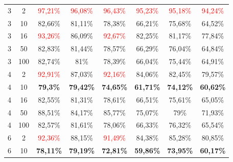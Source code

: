 \begin{table}[ht]
\begin{tabular}{cc|c|c|c|c|c|c}
        {3} & {2}   & \textcolor{red}{97,21\%} & \textcolor{red}{96,08\%} & \textcolor{red}{96,43\%} & \textcolor{red}{95,23\%} & \textcolor{red}{95,18\%} & \textcolor{red}{94,24\%} \\
        {3} & {10}  & {82,66\%}                & {81,11\%}                & {78,38\%}                & {66,21\%}                & {75,68\%}                & {64,52\%}                \\
        {3} & {16}  & \textcolor{red}{93,26\%} & {86,09\%}                & \textcolor{red}{92,67\%} & {82,25\%}                & {81,17\%}                & {77,84\%}                \\
        {3} & {50}  & {82,83\%}                & {81,44\%}                & {78,57\%}                & {66,29\%}                & {76,04\%}                & {64,84\%}                \\
        {3} & {100} & {82,74\%}                & {81\%}                   & {78,39\%}                & {66,04\%}                & {75,44\%}                & {64,91\%}                \\
        {4} & {2}   & \textcolor{red}{92,91\%} & {87,03\%}                & \textcolor{red}{92,16\%} & {84,06\%}                & {82,45\%}                & {79,57\%}                \\
        {4} & {10}  & \textbf{79,3\%}          & \textbf{79,42\%}         & \textbf{74,65\%}         & \textbf{61,71\%}         & \textbf{74,12\%}         & \textbf{60,62\%}         \\
        {4} & {16}  & {82,55\%}                & {81,31\%}                & {78,61\%}                & {66,51\%}                & {75,61\%}                & {65,05\%}                \\
        {4} & {50}  & {88,51\%}                & {84,17\%}                & {85,77\%}                & {75,07\%}                & {79\%}                   & {71,93\%}                \\
        {4} & {100} & {82,57\%}                & {81,61\%}                & {78,06\%}                & {66,33\%}                & {76,32\%}                & {65,54\%}                \\
        {6} & {2}   & \textcolor{red}{92,36\%} & {88,15\%}                & \textcolor{red}{91,49\%} & {84,38\%}                & {85,28\%}                & {80,85\%}                \\
        {6} & {10}  & \textbf{78,11\%}         & \textbf{79,19\%}         & \textbf{72,81\%}         & \textbf{59,86\%}         & \textbf{73,95\%}         & \textbf{60,17\%}         \\

\end{tabular}
\end{table}
